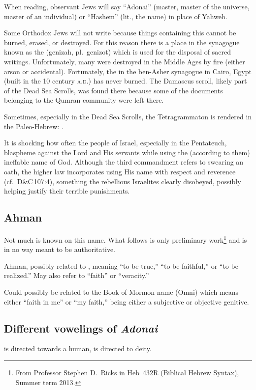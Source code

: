 When reading, observant Jews will say ``Adonai'' (master, master of the universe, master of an individual) or ``Hashem'' (lit., the name) in place of Yahweh.

Some Orthodox Jews will not write  because things containing this cannot be burned, erased, or destroyed. For this reason there is a place in the synagogue known as the  (genizah, pl.\ genizot) which is used for the disposal of sacred writings. Unfortunately, many  were destroyed in the Middle Ages by fire (either arson or accidental). Fortunately, the  in the ben-Asher synagogue in Cairo, Egypt (built in the 10 century \textsc{a.d.}) has never burned. The Damascus scroll, likely part of the Dead Sea Scrolls, was found there because some of the documents belonging to the Qumran community were left there.

Sometimes, especially in the Dead Sea Scrolls, the Tetragrammaton is rendered in the Paleo-Hebrew: .

It is shocking how often the people of Israel, especially in the Pentateuch, blaspheme against the Lord and His servants while using the (according to them) ineffable name of God. Although the third commandment refers to swearing an oath, the higher law incorporates using His name with respect and reverence (cf.~D\&C\,107:4), something the rebellious Israelites clearly disobeyed, possibly helping justify their terrible punishments.

\subsection{Ahman}
Not much is known on this name. What follows is only preliminary work\footnote{From Professor Stephen D.\ Ricks in Heb~432R (Biblical Hebrew Syntax), Summer term 2013.} and is in no way meant to be authoritative.

Ahman, possibly related to , meaning ``to be true,'' ``to be faithful,'' or ``to be realized.'' May also refer to ``faith'' or ``veracity.''

Could possibly be related to the Book of Mormon name  (Omni) which means either ``faith in me'' or ``my faith,''  being either a subjective or objective genitive.

\subsection{Different vowelings of \textit{Adonai}}\label{app:adonai}
 is directed towards a human,  is directed to deity.
